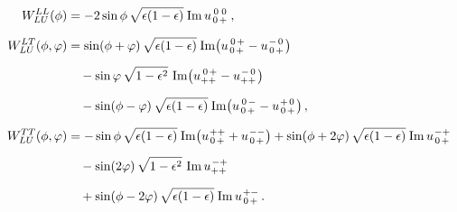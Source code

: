 \documentclass[12pt]{article}
\newcommand{\ms}{\mskip 1.5mu}
\newcommand{\im}{\operatorname{Im}}
\newcommand{\ru}[4]{u^{\ms #1 #2}_{#3 #4}}
\newcommand{\0}{{\mskip 2.5mu} 0 {\mskip 2.5mu}}
\begin{document}
%
\begin{align}
  \label{WLU}
W_{LU}^{LL}(\phi) &=
  - 2 \sin\phi\, \sqrt{\epsilon (1-\epsilon)}\ms \im\ru{\0}{\0}{\0}{+}
  \,,
  \phantom{\frac{1}{2}}
\nonumber \\
%
W_{LU}^{LT}(\phi,\varphi) &=
  \sin(\phi + \varphi)\, \sqrt{\epsilon (1-\epsilon)}\ms
    \im\bigl( \ru{\0}{+}{\0}{+} - \ru{-}{\0}{\0}{+} \bigr)
  \phantom{\frac{1}{2}}
\nonumber \\
& \quad{}
  - \sin\varphi\, \sqrt{1 - \epsilon^2}\,
    \im\bigl( \ru{\0}{+}{+}{+} - \ru{-}{\0}{+}{+} \bigr)
  \phantom{\frac{1}{2}}
\nonumber \\
& \quad{}
  - \sin(\phi - \varphi)\, \sqrt{\epsilon (1-\epsilon)}\ms
    \im\bigl( \ru{\0}{-}{\0}{+} - \ru{+}{\0}{\0}{+} \bigr) \,,
  \phantom{\frac{1}{2}}
\nonumber \\
%
W_{LU}^{TT}(\phi,\varphi) &=
  - \sin\phi\, \sqrt{\epsilon (1-\epsilon)}\ms
    \im\bigl( \ru{+}{+}{\0}{+} + \ru{-}{-}{\0}{+} \bigr)
  + \sin(\phi + 2\varphi)\, \sqrt{\epsilon (1-\epsilon)}\ms
    \im\ru{-}{+}{\0}{+}
  \phantom{\frac{1}{2}}
\nonumber \\
& \quad{}
  - \sin(2\varphi)\, \sqrt{1 - \epsilon^2}\, \im\ru{-}{+}{+}{+}
  \phantom{\frac{1}{2}}
\nonumber \\
& \quad{}
  + \sin(\phi - 2\varphi)\, \sqrt{\epsilon (1-\epsilon)}\ms
    \im\ru{+}{-}{\0}{+} \,.
  \phantom{\frac{1}{2}}
\end{align}
\end{document}
